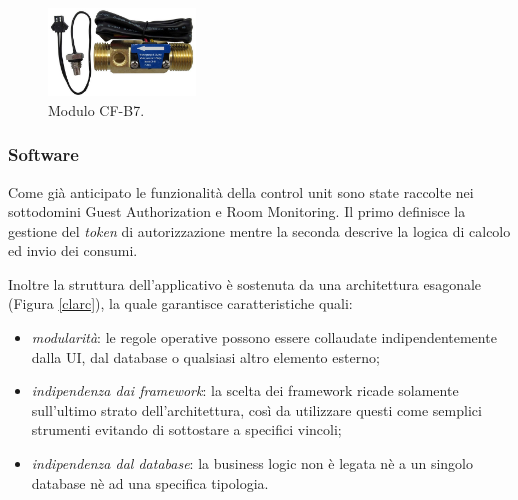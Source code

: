 \begin{figure}[H]
    \centering
    \includegraphics[width=0.35\textwidth]{images/sensors/cfb7.png}\hfill
    \caption{Modulo CF-B7.}
\end{figure}

\subsubsection{Software}
Come già anticipato le funzionalità della control unit sono state raccolte nei sottodomini Guest Authorization e Room Monitoring. Il primo definisce la gestione del \textit{token} di autorizzazione mentre la seconda descrive la logica di calcolo ed invio dei consumi.


Inoltre la struttura dell'applicativo è sostenuta da una architettura esagonale (Figura \ref*{clarc}), la quale garantisce caratteristiche quali:
\begin{itemize}
    \item \textit{modularità}: le regole operative possono essere collaudate indipendentemente dalla UI, dal database o qualsiasi altro elemento esterno;
    \item \textit{indipendenza dai framework}: la scelta dei framework ricade solamente sull'ultimo strato dell'architettura, così da utilizzare questi come semplici strumenti evitando di sottostare a specifici vincoli;
    \item \textit{indipendenza dal database}: la business logic non è legata nè a un singolo database nè ad una specifica tipologia.
\end{itemize}

